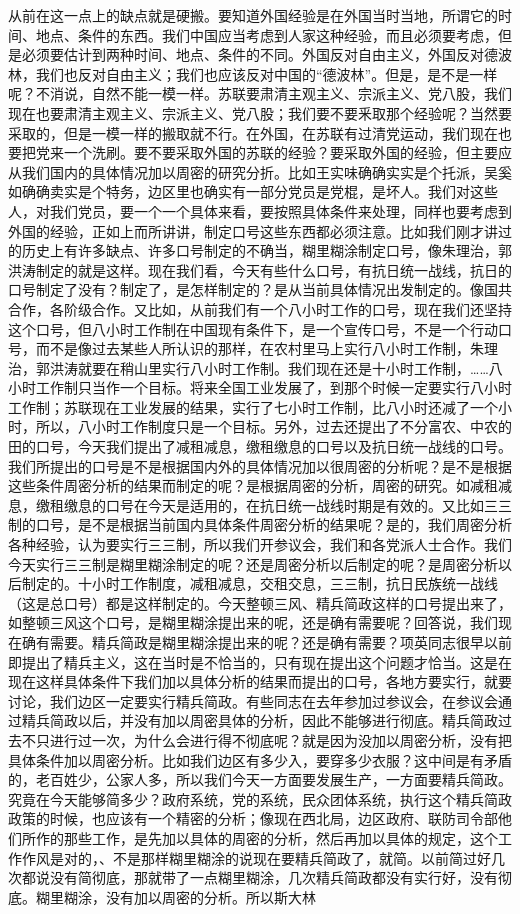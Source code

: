 从前在这一点上的缺点就是硬搬。要知道外国经验是在外国当时当地，所谓它的时间、地点、条件的东西。我们中国应当考虑到人家这种经验，而且必须要考虑，但是必须要估计到两种时间、地点、条件的不同。外国反对自由主义，外国反对德波林，我们也反对自由主义；我们也应该反对中国的“德波林”。但是，是不是一样呢？不消说，自然不能一模一样。苏联要肃清主观主义、宗派主义、党八股，我们现在也要肃清主观主义、宗派主义、党八股；我们要不要釆取那个经验呢？当然要采取的，但是一模一样的搬取就不行。在外国，在苏联有过清党运动，我们现在也要把党来一个洗刷。要不要采取外国的苏联的经验？要采取外国的经验，但主要应从我们国内的具体情况加以周密的研究分折。比如王实味确确实实是个托派，吴奚如确确卖实是个特务，边区里也确实有一部分党员是党棍，是坏人。我们对这些人，对我们党员，要一个一个具体来看，要按照具体条件来处理，同样也要考虑到外国的经验，正如上而所讲讲，制定口号这些东西都必须注意。比如我们刚才讲过的历史上有许多缺点、许多口号制定的不确当，糊里糊涂制定口号，像朱理治，郭洪涛制定的就是这样。现在我们看，今天有些什么口号，有抗日统一战线，抗日的口号制定了没有？制定了，是怎样制定的？是从当前具体情况出发制定的。像国共合作，各阶级合作。又比如，从前我们有一个八小时工作的口号，现在我们还坚持这个口号，但八小时工作制在中国现有条件下，是一个宣传口号，不是一个行动口号，而不是像过去某些人所认识的那样，在农村里马上实行八小时工作制，朱理治，郭洪涛就要在稍山里实行八小时工作制。我们现在还是十小时工作制，……八小时工作制只当作一个目标。将来全国工业发展了，到那个时候一定要实行八小时工作制；苏联现在工业发展的结果，实行了七小时工作制，比八小时还减了一个小时，所以，八小时工作制度只是一个目标。另外，过去还提出了不分富农、中农的田的口号，今天我们提出了减租减息，缴租缴息的口号以及抗日统一战线的口号。我们所提出的口号是不是根据国内外的具体情况加以很周密的分析呢？是不是根据这些条件周密分析的结果而制定的呢？是根据周密的分析，周密的研究。如减租减息，缴租缴息的口号在今天是适用的，在抗日统一战线时期是有效的。又比如三三制的口号，是不是根据当前国内具体条件周密分析的结果呢？是的，我们周密分析各种经验，认为要实行三三制，所以我们开参议会，我们和各党派人士合作。我们今天实行三三制是糊里糊涂制定的呢？还是周密分析以后制定的呢？是周密分析以后制定的。十小时工作制度，减租减息，交租交息，三三制，抗日民族统一战线（这是总口号）都是这样制定的。今天整顿三风、精兵简政这样的口号提出来了，如整顿三风这个口号，是糊里糊涂提出来的呢，还是确有需要呢？回答说，我们现在确有需要。精兵简政是糊里糊涂提出来的呢？还是确有需要？项英同志很早以前即提出了精兵主义，这在当时是不恰当的，只有现在提出这个问题才恰当。这是在现在这样具体条件下我们加以具体分析的结果而提出的口号，各地方要实行，就要讨论，我们边区一定要实行精兵简政。有些同志在去年参加过参议会，在参议会通过精兵简政以后，并没有加以周密具体的分析，因此不能够进行彻底。精兵简政过去不只进行过一次，为什么会进行得不彻底呢？就是因为没加以周密分析，没有把具体条件加以周密分析。比如我们边区有多少入，要穿多少衣服？这中间是有矛盾的，老百姓少，公家人多，所以我们今天一方面要发展生产，一方面要精兵简政。究竟在今天能够简多少？政府系统，党的系统，民众团体系统，执行这个精兵简政政策的时候，也应该有一个精密的分析；像现在西北局，边区政府、联防司令部他们所作的那些工作，是先加以具体的周密的分析，然后再加以具体的规定，这个工作作风是对的，、不是那样糊里糊涂的说现在要精兵简政了，就简。以前简过好几次都说没有简彻底，那就带了一点糊里糊涂，几次精兵简政都没有实行好，没有彻底。糊里糊涂，没有加以周密的分析。所以斯大林
